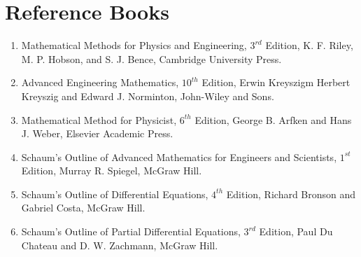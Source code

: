 \documentclass[a4aper,12pt]{report}
\begin{document}
\chapter*{Reference Books}
\vspace*{-2.7cm}
\thispagestyle{empty}
\begin{enumerate}
    \item Mathematical Methods for Physics and Engineering, $3^{rd}$ Edition, K. F. Riley, M. P. Hobson, and S. J. Bence, Cambridge University Press.
    \item Advanced Engineering Mathematics, $10^{th}$ Edition, Erwin Kreyszigm Herbert Kreyszig and Edward J. Norminton, John-Wiley and Sons.
    \item Mathematical Method for Physicist, $6^{th}$ Edition, George B. Arfken and Hans J. Weber, Elsevier Academic Press.
    \item Schaum's Outline of Advanced Mathematics for Engineers and Scientists, $1^{st}$ Edition, Murray R. Spiegel, McGraw Hill.
    \item Schaum's Outline of Differential Equations, $4^{th}$ Edition, Richard Bronson and Gabriel Costa, McGraw Hill.
    \item Schaum's Outline of Partial Differential Equations, $3^{rd}$ Edition, Paul Du Chateau and D. W. Zachmann, McGraw Hill.
\end{enumerate}
\tableofcontents 
\thispagestyle{empty}
\newpage
\setcounter{page}{1}
\end{document}
